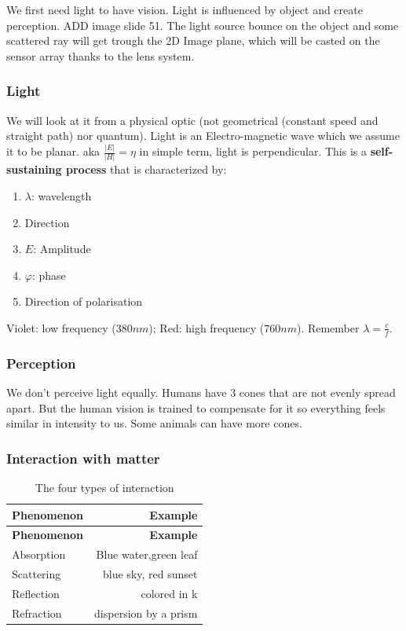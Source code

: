 \documentclass[
  a4paper,
  ,captions=tableheading
]{scrartcl}
\providecommand{\tightlist}{%
  \setlength{\itemsep}{0pt}\setlength{\parskip}{0pt}}
\begin{document}
We first need light to have vision. Light is influenced by object and
create perception. ADD image slide 51. The light source bounce on the
object and some scattered ray will get trough the 2D Image plane, which
will be casted on the sensor array thanks to the lens system.

\subsubsection{Light}\label{light}

We will look at it from a physical optic (not geometrical (constant
speed and straight path) nor quantum). Light is an Electro-magnetic wave
which we assume it to be planar. aka \(\frac{|E|}{|H|} = \eta\) in
simple term, light is perpendicular. This is a \textbf{self-sustaining
process} that is characterized by:

\begin{enumerate}
\def\labelenumi{\arabic{enumi}.}
\tightlist
\item
  \(\lambda\): wavelength
\item
  Direction
\item
  \(E\): Amplitude
\item
  \(\varphi\): phase
\item
  Direction of polarisation
\end{enumerate}

Violet: low frequency (\(380 nm\)); Red: high frequency (\(760 nm\)).
Remember \(\lambda = \frac{c}{f}\).

\subsubsection{Perception}\label{perception}

We don't perceive light equally. Humans have 3 cones that are not evenly
spread apart. But the human vision is trained to compensate for it so
everything feels similar in intensity to us. Some animals can have more
cones.

\subsubsection{Interaction with matter}\label{interaction-with-matter}

\begin{longtable}[]{@{}lr@{}}
\caption{The four types of interaction}\tabularnewline
\toprule\noalign{}
\textbf{Phenomenon} & \textbf{Example} \\
\midrule\noalign{}
\endfirsthead
\toprule\noalign{}
\textbf{Phenomenon} & \textbf{Example} \\
\midrule\noalign{}
\endhead
\bottomrule\noalign{}
\endlastfoot
Absorption & Blue water,green leaf \\
Scattering & blue sky, red sunset \\
Reflection & colored in k \\
Refraction & dispersion by a prism \\
\end{longtable}
\end{document}
